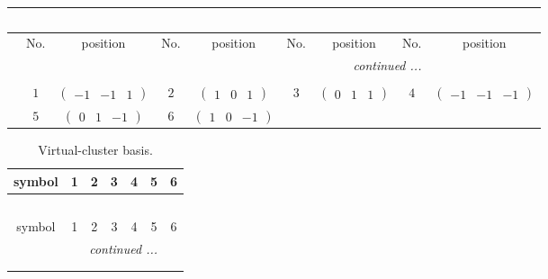 \documentclass[fleqn,10pt,landscape]{article}
\begin{document}
\begin{itemize}
{\begin{center}
\begin{longtable}{ccccccccc}
\multicolumn{8}{l}{\tablename\ \thetable{}} \\
 \hline \hline
 & No. & position & No. & position & No. & position & No. & position \\ \hline \endhead

 \hline \hline
\multicolumn{8}{r}{\footnotesize\it continued ...} \\ \endfoot

 \hline \hline
\multicolumn{8}{r}{} \\ \endlastfoot

 & $ 1 $ & $ \begin{pmatrix} -1 & -1 & 1 \end{pmatrix} $ & $ 2 $ & $ \begin{pmatrix} 1 & 0 & 1 \end{pmatrix} $ & $ 3 $ & $ \begin{pmatrix} 0 & 1 & 1 \end{pmatrix} $ & $ 4 $ & $ \begin{pmatrix} -1 & -1 & -1 \end{pmatrix} $ \\
& $ 5 $ & $ \begin{pmatrix} 0 & 1 & -1 \end{pmatrix} $ & $ 6 $ & $ \begin{pmatrix} 1 & 0 & -1 \end{pmatrix} $ & $  $ & $  $ & $  $ & $  $ \\
\end{longtable}
\end{center}
\begin{center}
\renewcommand{\arraystretch}{1.7}
\begin{longtable}{ccccccc}
\caption{Virtual-cluster basis.}
 \\
 \hline \hline
symbol & 1 & 2 & 3 & 4 & 5 & 6 \\ \hline \endfirsthead

\multicolumn{6}{l}{\tablename\ \thetable{}} \\
 \hline \hline
symbol & 1 & 2 & 3 & 4 & 5 & 6 \\ \hline \endhead

 \hline \hline
\multicolumn{6}{r}{\footnotesize\it continued ...} \\ \endfoot

 \hline \hline
\multicolumn{6}{r}{} \\ \endlastfoot


\end{longtable}
\end{center}}
\end{itemize}
\end{document}
